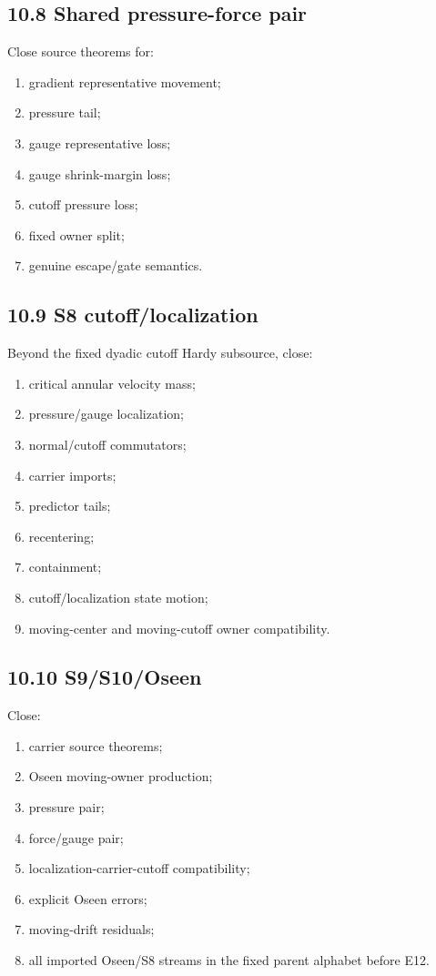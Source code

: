 \documentclass[11pt]{article}
\begin{document}
\subsection*{10.8 Shared pressure-force pair}

Close source theorems for:

\begin{enumerate}
\item
  gradient representative movement;
\item
  pressure tail;
\item
  gauge representative loss;
\item
  gauge shrink-margin loss;
\item
  cutoff pressure loss;
\item
  fixed owner split;
\item
  genuine escape/gate semantics.
\end{enumerate}

\subsection*{10.9 S8 cutoff/localization}

Beyond the fixed dyadic cutoff Hardy subsource, close:

\begin{enumerate}
\item
  critical annular velocity mass;
\item
  pressure/gauge localization;
\item
  normal/cutoff commutators;
\item
  carrier imports;
\item
  predictor tails;
\item
  recentering;
\item
  containment;
\item
  cutoff/localization state motion;
\item
  moving-center and moving-cutoff owner compatibility.
\end{enumerate}

\subsection*{10.10 S9/S10/Oseen}

Close:

\begin{enumerate}
\item
  carrier source theorems;
\item
  Oseen moving-owner production;
\item
  pressure pair;
\item
  force/gauge pair;
\item
  localization-carrier-cutoff compatibility;
\item
  explicit Oseen errors;
\item
  moving-drift residuals;
\item
  all imported Oseen/S8 streams in the fixed parent alphabet before E12.
\end{enumerate}
\end{document}
